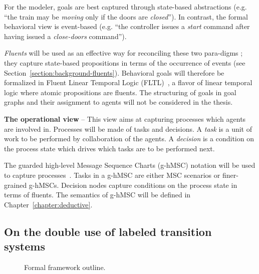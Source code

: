 For the modeler, goals are best captured through state-based abstractions (e.g. ``the train may be \emph{moving} only if the doors are \emph{closed}''). In contrast, the formal behavioral view is event-based (e.g. ``the controller issues a \emph{start} command after having issued a \emph{close-doors} command''). 

\emph{Fluents} will be used as an effective way for reconciling these two para-digms \cite{Miller:2002}; they capture state-based propositions in terms of the occurrence of events (see Section~\ref{section:background-fluents}). Behavioral goals will therefore be formalized in Fluent Linear Temporal Logic (FLTL)~\cite{Giannakopoulou:2003}, a flavor of linear temporal logic where atomic propositions are fluents. The structuring of goals in goal graphs and their assignment to agents will not be considered in the thesis.


\noindent \textbf{The operational view} -- This view aims at capturing processes which agents are involved in. Processes will be made of tasks and decisions. A \emph{task} is a unit of work to be performed by collaboration of the agents. A \emph{decision} is a condition on the process state which drives which tasks are to be performed next.

The guarded high-level Message Sequence Charts (g-hMSC) notation will be used to capture processes~\cite{Damas:2009, Damas:2011}. Tasks in a g-hMSC are either MSC scenarios or finer-grained g-hMSCs. Decision nodes capture conditions on the process state in terms of fluents. The semantics of g-hMSC will be defined in Chapter~\ref{chapter:deductive}.


\subsection{On the double use of labeled transition systems}

\begin{figure}[H]\centering
  \caption{Formal framework outline.\label{image:framework}}
\end{figure}

